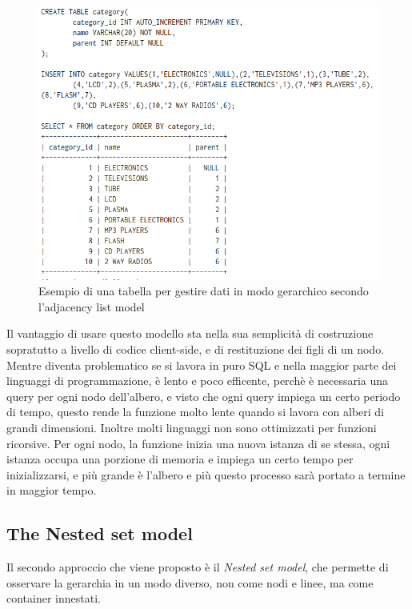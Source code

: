 \begin{figure}[ht!]
    \centering
	\includegraphics[scale=0.75]{images/Adjacency_list_model_table.PNG}
	\caption{Esempio di una tabella per gestire dati in modo gerarchico secondo l'adjacency list model }
\end{figure}
 
Il vantaggio di usare questo modello sta nella sua semplicità di costruzione sopratutto a livello di codice client-side, 
e di restituzione dei figli di un nodo. Mentre diventa problematico se si lavora in puro SQL e nella maggior parte dei linguaggi di 
programmazione, è lento e poco efficente, perchè è necessaria una query per ogni nodo dell'albero, e visto che ogni query impiega 
un certo periodo di tempo, questo rende la funzione molto lente quando si lavora con alberi di grandi dimensioni.
Inoltre molti linguaggi non sono ottimizzati per funzioni ricorsive. Per ogni nodo, la funzione inizia una nuova istanza di se stessa,
ogni istanza occupa una porzione di memoria e impiega un certo tempo per inizializzarsi, e più grande è l'albero e più questo 
processo sarà portato a termine in maggior tempo.

\subsection{The Nested set model}
Il secondo approccio che viene proposto è il \textit{Nested set model}, che permette di osservare la gerarchia in un modo diverso, non 
come nodi e linee, ma come container innestati. \\

